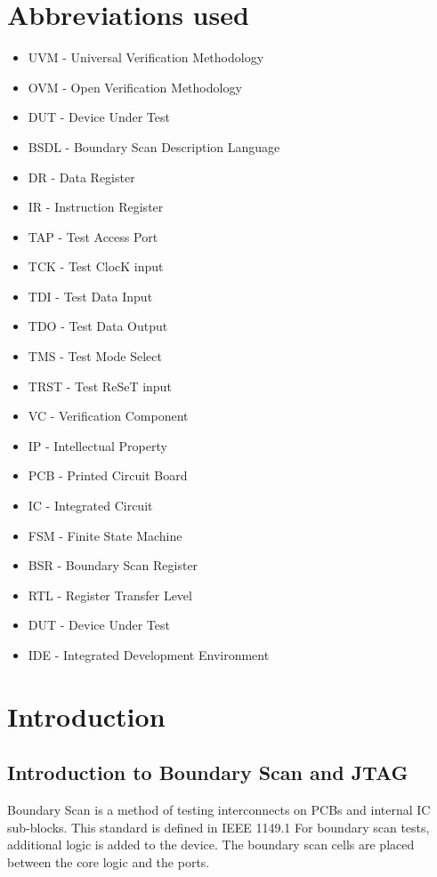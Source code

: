 \documentclass[a4paper,11pt]{article}
\begin{document}
\section{Abbreviations used}
\begin{itemize}[noitemsep]
 \item UVM  - Universal Verification Methodology 
 \item OVM  - Open Verification Methodology
 \item DUT  - Device Under Test
 \item BSDL - Boundary Scan Description Language
 \item DR   - Data Register
 \item IR   - Instruction Register
 \item TAP  - Test Access Port
 \item TCK  - Test ClocK input
 \item TDI  - Test Data Input
 \item TDO  - Test Data Output
 \item TMS  - Test Mode Select
 \item TRST - Test ReSeT input
 \item VC   - Verification Component
 \item IP   - Intellectual Property 
 \item PCB  - Printed Circuit Board
 \item IC   - Integrated Circuit
 \item FSM  - Finite State Machine
 \item BSR  - Boundary Scan Register
 \item RTL  - Register Transfer Level
 \item DUT  - Device Under Test
 \item IDE  - Integrated Development Environment
\end{itemize}


\newpage
\pagebreak
\section{Introduction}

\subsection{Introduction to Boundary Scan and JTAG}
Boundary Scan is a method of testing interconnects on PCBs and internal IC sub-blocks. This standard is defined in IEEE 1149.1
For boundary scan tests, additional logic is added to the device. The boundary scan cells are placed between the core logic and the ports.
\end{document}
